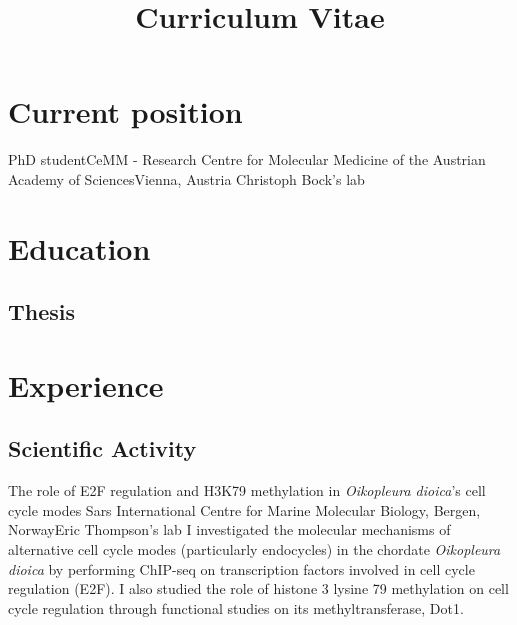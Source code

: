 \documentclass[11pt,a4paper,roman]{moderncv} %
\title{Curriculum Vitae}
\begin{document}
\makecvtitle %


\section{Current position}
	{PhD student}{CeMM - Research Centre for Molecular Medicine of the Austrian Academy of Sciences}{Vienna, Austria}
	{Christoph Bock's lab}{}


\section{Education}


	\subsection{Thesis}


\section{Experience}

	\subsection{Scientific Activity}

		{The role of E2F regulation and H3K79 methylation in \textit{Oikopleura dioica}'s cell cycle modes}
		{Sars International Centre for Marine Molecular Biology, Bergen, Norway}{Eric Thompson's lab}
		{}
		{I investigated the molecular mechanisms of alternative cell cycle modes (particularly endocycles) in the chordate \textit{Oikopleura dioica} by performing ChIP-seq on transcription factors involved in cell cycle regulation (E2F). I also studied the role of histone 3 lysine 79 methylation on cell cycle regulation through functional studies on its methyltransferase, Dot1.}
	
\end{document}
